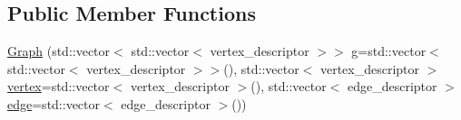 \subsection*{\-Public \-Member \-Functions}
\begin{DoxyCompactItemize}
\item 
\hyperlink{classGraph_aba75719c94e12e3ff1d6910c488e64bf}{\-Graph} (std\-::vector$<$ std\-::vector$<$ vertex\-\_\-descriptor $>$$>$ g=std\-::vector$<$ std\-::vector$<$ vertex\-\_\-descriptor $>$$>$(), std\-::vector$<$ vertex\-\_\-descriptor $>$ \hyperlink{classGraph_aee1ef7db65385d0531a828366cf71b4c}{vertex}=std\-::vector$<$ vertex\-\_\-descriptor $>$(), std\-::vector$<$ edge\-\_\-descriptor $>$ \hyperlink{classGraph_adb12e656aebb03ea5118a95399f45444}{edge}=std\-::vector$<$ edge\-\_\-descriptor $>$())
\end{DoxyCompactItemize}
